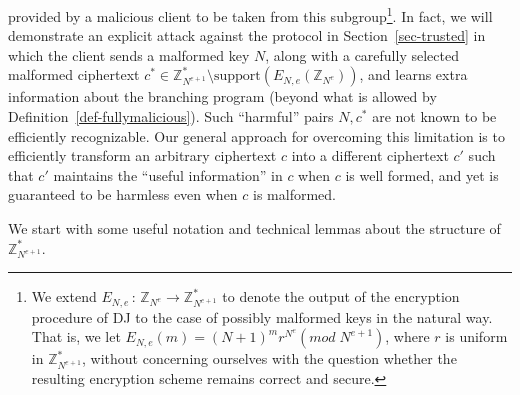 \documentclass{article}
\newcommand{\encdj}{{E}_{N,e}}
\newcommand{\support}{{\mathrm{support}}}
\newcommand{\plain}{{{M}}}
\newcommand{\plaintext}[1]{\plain_{#1}}
\newcommand{\fnrngdom}[2]{#1\to#2}
\newcommand{\fndef}[3]{{#1\,:\,\fnrngdom{#2}{#3}}}
\newcommand{\Z}{{\mathbb{Z}}}
\newcommand{\ot}{\mbox{OT}\;}
\newcommand{\U}[1]{\mathbb{Z}_{#1}^*}
\begin{document}
provided by a malicious client to be taken from this subgroup\footnote{We extend $\fndef{E_{N,e}}{\Z_{N^e}}{\Z^*_{N^{e+1}}}$ to denote
the output of the encryption procedure of DJ to the case of possibly malformed keys in the natural way. That is, we let $E_{N,e}(m)=(N+1)^mr^{N^e}(mod\;N^{e+1})$,
where $r$ is uniform in $\Z^*_{N^{e+1}}$, without concerning ourselves with the question whether the resulting encryption scheme remains correct and secure.}. In
fact, we will demonstrate an explicit attack against the protocol
in Section~\ref{sec-trusted} in which the client sends a malformed
key $N$, along with a carefully selected malformed ciphertext
$c^*\in \U{N^{e+1}}\setminus \support(\encdj(\Z_{N^e}))$, and
learns extra information about the branching program (beyond what
is allowed by Definition~\ref{def-fullymalicious}). Such
``harmful'' pairs $N,c^*$ are not known to be efficiently
recognizable. Our general approach for overcoming this limitation
is to efficiently transform an arbitrary ciphertext $c$ into a
different ciphertext $c'$ such that $c'$ maintains the ``useful
information'' in $c$ when $c$ is well formed, and yet is guaranteed
to be harmless even when $c$ is malformed.

\medskip

We start with some useful notation and technical lemmas about the structure of
$\U{N^{e+1}}$.
\end{document}
